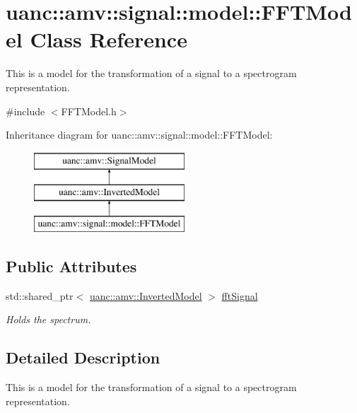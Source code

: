\hypertarget{classuanc_1_1amv_1_1signal_1_1model_1_1_f_f_t_model}{}\section{uanc\+:\+:amv\+:\+:signal\+:\+:model\+:\+:F\+F\+T\+Model Class Reference}
\label{classuanc_1_1amv_1_1signal_1_1model_1_1_f_f_t_model}


This is a model for the transformation of a signal to a spectrogram representation.  




{\ttfamily \#include $<$F\+F\+T\+Model.\+h$>$}

Inheritance diagram for uanc\+:\+:amv\+:\+:signal\+:\+:model\+:\+:F\+F\+T\+Model\+:\begin{figure}[H]
\begin{center}
\leavevmode
\includegraphics[height=3.000000cm]{classuanc_1_1amv_1_1signal_1_1model_1_1_f_f_t_model}
\end{center}
\end{figure}
\subsection*{Public Attributes}
\begin{DoxyCompactItemize}
\item 
std\+::shared\+\_\+ptr$<$ \hyperlink{classuanc_1_1amv_1_1_inverted_model}{uanc\+::amv\+::\+Inverted\+Model} $>$ \hyperlink{classuanc_1_1amv_1_1signal_1_1model_1_1_f_f_t_model_a1a63228d3c06b13ffb95038823fac3ae}{fft\+Signal}
\begin{DoxyCompactList}\small\item\em Holds the spectrum. \end{DoxyCompactList}\end{DoxyCompactItemize}


\subsection{Detailed Description}
This is a model for the transformation of a signal to a spectrogram representation. 

